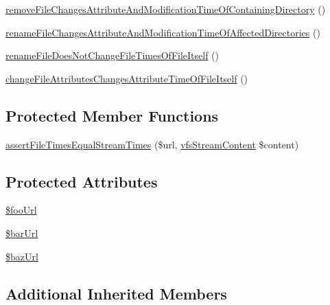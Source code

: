 \begin{DoxyCompactItemize}
\item 
\mbox{\hyperlink{classorg_1_1bovigo_1_1vfs_1_1vfs_stream_wrapper_file_times_test_case_a7ea83b99e3dd2edace1f11bca24ce676}{remove\+File\+Changes\+Attribute\+And\+Modification\+Time\+Of\+Containing\+Directory}} ()
\item 
\mbox{\hyperlink{classorg_1_1bovigo_1_1vfs_1_1vfs_stream_wrapper_file_times_test_case_af8690006ca531e4ead9213eca9532af7}{rename\+File\+Changes\+Attribute\+And\+Modification\+Time\+Of\+Affected\+Directories}} ()
\item 
\mbox{\hyperlink{classorg_1_1bovigo_1_1vfs_1_1vfs_stream_wrapper_file_times_test_case_a7d2e4aec32f0223382734c9530bf940b}{rename\+File\+Does\+Not\+Change\+File\+Times\+Of\+File\+Itself}} ()
\item 
\mbox{\hyperlink{classorg_1_1bovigo_1_1vfs_1_1vfs_stream_wrapper_file_times_test_case_a651d0c1b53dddfffda3e310a3fe7e4c2}{change\+File\+Attributes\+Changes\+Attribute\+Time\+Of\+File\+Itself}} ()
\end{DoxyCompactItemize}
\subsection*{Protected Member Functions}
\begin{DoxyCompactItemize}
\item 
\mbox{\hyperlink{classorg_1_1bovigo_1_1vfs_1_1vfs_stream_wrapper_file_times_test_case_a180a820b8a0505883a90454a3909aceb}{assert\+File\+Times\+Equal\+Stream\+Times}} (\$url, \mbox{\hyperlink{interfaceorg_1_1bovigo_1_1vfs_1_1vfs_stream_content}{vfs\+Stream\+Content}} \$content)
\end{DoxyCompactItemize}
\subsection*{Protected Attributes}
\begin{DoxyCompactItemize}
\item 
\mbox{\hyperlink{classorg_1_1bovigo_1_1vfs_1_1vfs_stream_wrapper_file_times_test_case_a4dd9908098a3fa98af9c46133cc1a525}{\$foo\+Url}}
\item 
\mbox{\hyperlink{classorg_1_1bovigo_1_1vfs_1_1vfs_stream_wrapper_file_times_test_case_adc7d6c3a89c9853b445b666a7658eb85}{\$bar\+Url}}
\item 
\mbox{\hyperlink{classorg_1_1bovigo_1_1vfs_1_1vfs_stream_wrapper_file_times_test_case_acad84c9df5e2dc169be209c577886401}{\$baz\+Url}}
\end{DoxyCompactItemize}
\subsection*{Additional Inherited Members}


